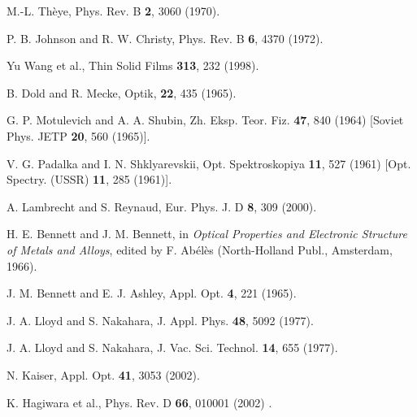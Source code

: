 \documentclass[prb]{revtex4}%
\begin{document}
\begin{references}
  M.-L. Th\`{e}ye, Phys. Rev. B {\bf 2}, 3060 (1970).

  P. B. Johnson and R. W. Christy, Phys. Rev. B {\bf 6},
4370 (1972).

  Yu Wang et al., Thin Solid Films {\bf 313}, 232
(1998).

  B. Dold and R. Mecke, Optik, {\bf 22}, 435 (1965).

  G. P. Motulevich and A. A. Shubin, Zh. Eksp. Teor.
Fiz. {\bf 47}, 840 (1964) [Soviet Phys. JETP {\bf 20}, 560 (1965)].

  V. G. Padalka and I. N. Shklyarevskii, Opt.
Spektroskopiya {\bf 11}, 527 (1961) [Opt. Spectry. (USSR) {\bf 11},
285 (1961)].

  A. Lambrecht and S. Reynaud, Eur. Phys. J. D {\bf 8},
309 (2000).

  H. E. Bennett and J. M. Bennett, in \emph{Optical
Properties and Electronic Structure of Metals and Alloys}, edited by
F. Ab\'{e}l\`{e}s (North-Holland Publ., Amsterdam, 1966).

  J. M. Bennett and E. J. Ashley, Appl. Opt. {\bf 4}, 221
(1965).

 J. A. Lloyd and S. Nakahara, J. Appl. Phys. {\bf 48},
5092 (1977).

 J. A. Lloyd and S. Nakahara, J. Vac. Sci. Technol. {\bf 14},
655 (1977).

 N. Kaiser, Appl. Opt. {\bf 41}, 3053 (2002).

 K. Hagiwara et al., Phys. Rev. D {\bf 66}, 010001 (2002) .


\end{references}
\end{document}
